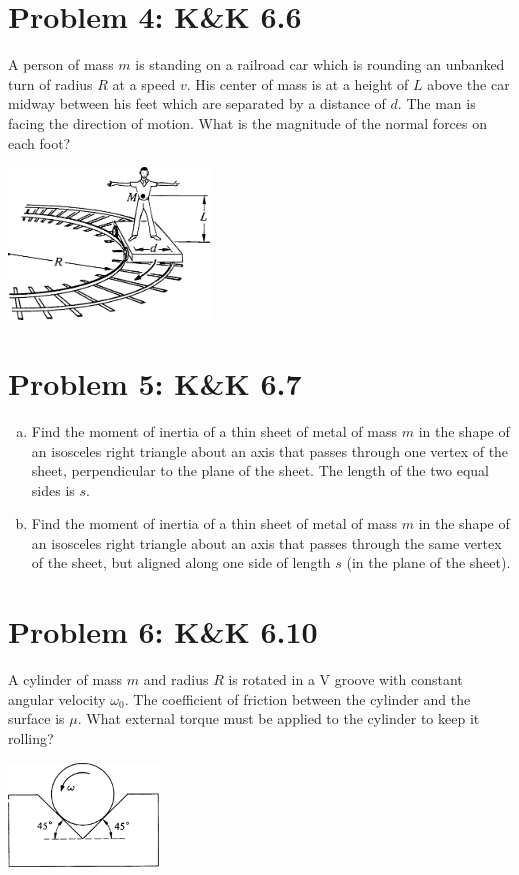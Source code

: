 \documentclass[problems]{esg8012pset}
\begin{document}
\section*{Problem 4: K\&K 6.6}
  A person of mass $m$ is standing on a railroad car which is rounding an unbanked turn of radius $R$ at a speed $v$. His center of mass is at a height of $L$ above the car midway between his feet which are separated by a distance of $d$. The man is facing the direction of motion. What is the magnitude of the normal forces on each foot?
  \begin{center}\includegraphics[width=0.4\textwidth]{ps08_3}\end{center}
\section*{Problem 5: K\&K 6.7}
  \begin{enumerate}[(a)]
    \item Find the moment of inertia of a thin sheet of metal of mass $m$ in the shape of an isosceles right triangle about an axis that passes through one vertex of the sheet, perpendicular to the plane of the sheet. The length of the two equal sides is $s$.
    \item Find the moment of inertia of a thin sheet of metal of mass $m$ in the shape of an isosceles right triangle about an axis that passes through the same vertex of the sheet, but aligned along one side of length $s$ (in the plane of the sheet).
  \end{enumerate}
\section*{Problem 6: K\&K 6.10}
  A cylinder of mass $m$ and radius $R$ is rotated in a V groove with constant angular velocity $\omega_{0}$.
The coefficient of friction between the cylinder and the surface is $\mu$. What external torque must be applied to the cylinder to keep it rolling?
  \begin{center}\includegraphics[width=0.3\textwidth]{ps08_4}\end{center}
\end{document}
